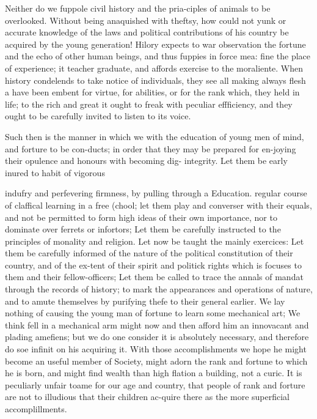 \documentclass{article}
\begin{document}
Neither do we fuppole civil history and the pria-ciples of animals to be overlooked. Without being anaquished with theftsy, how could not yunk or accurate knowledge of the laws and political contributions of his country be acquired by the young generation! Hilory expects to war observation the fortune and the echo of other human beings, and thus fuppies in force mea: fine the place of experience; it teacher graduate, and affords exercise to the moraliente. When history condelends to take notice of individuals, they see all making always flesh a have been embent for virtue, for abilities, or for the rank which, they held in life; to the rich and great it ought to freak with peculiar effficiency, and they ought to be carefully invited to listen to its voice.

Such then is the manner in which we with the education of young men of mind, and forture to be con-ducts; in order that they may be prepared for en-joying their opulence and honours with becoming dig- integrity. Let them be early inured to habit of vigorous

indufry and perfevering firmness, by pulling through a Education. regular course of claffical learning in a free (chool; let them play and converser with their equals, and not be permitted to form high ideas of their own importance, nor to dominate over ferrets or infortors; Let them be carefully instructed to the principles of monality and religion. Let now be taught the mainly exercices: Let them be carefully informed of the nature of the political constitution of their country, and of the ex-tent of their spirit and politick rights which is focuses to them and their fellow-officers; Let them be called to trace the annals of mandat through the records of history; to mark the appearances and operations of nature, and to amute themselves by purifying thefe to their general earlier. We lay nothing of causing the young man of fortune to learn some mechanical art; We think fell in a mechanical arm might now and then afford him an innovacant and plading amefiens; but we do one consider it is absolutely necessary, and therefore do soe infinit on his acquiring it. With those accomplishments we hope he might become an useful member of Society, might adorn the rank and fortune to which he is born, and might find wealth than high flation a building, not a curic. It is peculiarly unfair toame for our age and country, that people of rank and forture are not to illudious that their children ac-quire there as the more superficial accomplillments.
\end{document}
